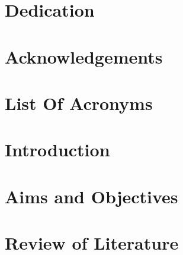 \documentclass[12pt,oneside]{report}
\renewcommand{\headrulewidth}{0.4pt}
\renewcommand{\footrulewidth}{0.4pt}
\begin{document}





\doublespacing
{}


\chapter*{Dedication}
\dedications

  
\chapter*{Acknowledgements}
\acknowledgments




\clearpage                       %
{                                %
	\pagestyle{empty}              %
	{
		\fancyhf{}%
		\renewcommand{\headrulewidth}{0pt}%
		\renewcommand{\footrulewidth}{0pt}%
	}
	\tableofcontents
	\thispagestyle{empty}          %
}


\listoffigures


\listoftables

\chapter*{List Of Acronyms}
\thesisabbr


\clearpage    


\chapter{Introduction}


\chapter{Aims and Objectives}


\chapter{Review of Literature}

\end{document}
